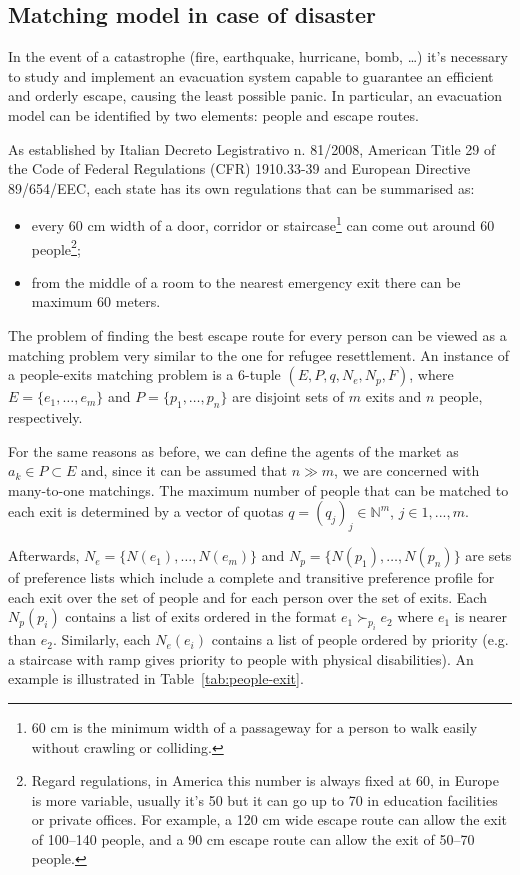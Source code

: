 \subsection{Matching model in case of disaster}\label{matching-model-in-case-of-disaster}%


In the event of a catastrophe (fire, earthquake, hurricane, bomb, \ldots) it's necessary to study and implement an evacuation system capable to guarantee an efficient and orderly escape, causing the least possible panic. In particular, an evacuation model can be identified by two elements: people and escape routes.

\nocite{it-81-2008,usa-1910-1974,cee-654-1989}%
As established by Italian Decreto Legistrativo n. 81/2008, American Title 29 of the Code of Federal Regulations (CFR)
1910.33-39 and European Directive 89/654/EEC, each state has its own regulations that can be summarised as:
\begin{itemize}
    \item every 60 cm width of a door, corridor or staircase\footnote{60 cm is the minimum width of a passageway for a person to walk easily without crawling or colliding.} can come out around 60 people\footnote{Regard regulations, in America this number is always fixed at 60, in Europe is more variable, usually it's 50 but it can go up to 70 in education facilities or private offices. For example, a 120 cm wide escape route can allow the exit of 100--140 people, and a 90 cm escape route can allow the exit of 50--70 people.};
    \item from the middle of a room to the nearest emergency exit there can be maximum 60 meters.
\end{itemize}

The problem of finding the best escape route for every person can be viewed as a matching problem very similar to the one for refugee resettlement. An instance of a people-exits matching problem is a 6-tuple \((E, P, q, N_e, N_p, F)\), where \(E = \{e_1, \dots, e_m\}\) and \(P = \{p_1, \dots, p_n\}\) are disjoint sets of \(m\) exits and \(n\) people, respectively.

For the same reasons as before, we can define the agents of the market as \(a_k \in P \subset E\) and, since it can be assumed that \(n \gg m\), we are concerned with many-to-one matchings. The maximum number of people that can be matched to each exit is determined by a vector of quotas \(q = (q_j)_j \in \mathbb{N}^m\), \(j\in {1,...,m}\).

Afterwards, \(N_e = \{N(e_1), \dots, N(e_m)\}\) and \(N_p = \{ N(p_1), \dots, N(p_n)\}\) are sets of preference lists which include a complete and transitive preference profile for each exit over the set of people and for each person over the set of exits. Each \(N_p(p_i)\) contains a list of exits ordered in the format \(e_1 \succ_{p_i} e_2\) where \(e_1\) is nearer than \(e_2\). Similarly, each \(N_e(e_i)\) contains a list of people ordered by priority (e.g. a staircase with ramp gives priority to people with physical disabilities). An example is illustrated in Table~\ref{tab:people-exit}.


